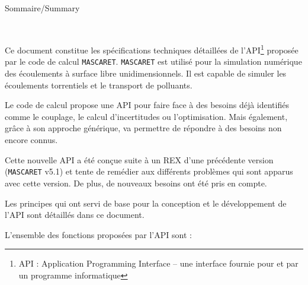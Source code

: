 \documentclass[a4paper,11pt]{article}
\begin{document}
\newpage

\begin{center} Sommaire/Summary\end{center}\


\tableofcontents

\newpage

 
 Ce document constitue les sp\'ecifications techniques d\'etaill\'ees de l'API\footnote{API : Application Programming Interface -- une interface fournie pour et par un programme informatique} propos\'ee par le code de calcul \texttt{MASCARET}. \texttt{MASCARET} est utilis\'e pour la simulation num\'erique des \'ecoulements \`a surface libre unidimensionnels. Il est capable de simuler les \'ecoulements torrentiels et le transport de polluants.

 \vspace{0.5cm} 

 Le code de calcul propose une API pour faire face \`a des besoins d\'ej\`a identifi\'es comme le couplage, le calcul d'incertitudes ou l'optimisation. Mais \'egalement, gr\^ace \`a son approche g\'en\'erique, va permettre de r\'epondre \`a des besoins non encore connus.

 \vspace{0.5cm} 

 Cette nouvelle API a \'et\'e con\c{c}ue suite \`a un REX d'une pr\'ec\'edente version (\texttt{MASCARET} v5.1) et tente de rem\'edier aux diff\'erents probl\`emes qui sont apparus avec cette version. De plus, de nouveaux besoins ont \'et\'e pris en compte.

 \vspace{0.5cm}  
 
 Les principes qui ont servi de base pour la conception et le d\'eveloppement de l'API sont d\'etaill\'es dans ce document.

 \vspace{0.5cm}  
   
 L'ensemble des fonctions propos\'ees par l'API sont :
 
 \newpage
 
\end{document}
